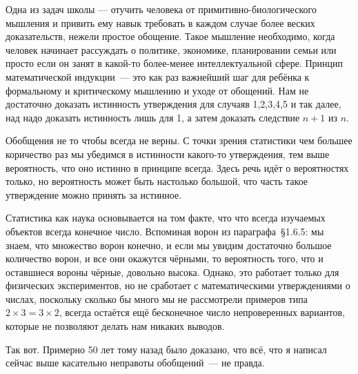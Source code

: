 Одна из задач школы --- отучить человека от примитивно-биологического мышления и привить ему навык требовать в каждом случае более веских доказательств, нежели простое обощение. Такое мышление необходимо, когда человек начинает рассуждать о политике, экономике, планировании семьи или просто если он занят в какой-то более-менее интеллектуальной сфере. Принцип математической индукции~--- это как раз важнейший шаг для ребёнка к формальному и критическому мышлению и уходе от обощений. Нам не достаточно доказать истинность утверждения для случаяв 1,2,3,4,5 и так далее, над надо доказать истинность лишь для 1, а затем доказать следствие $n+1$ из $n$.

Обобщения не то чтобы всегда не верны. С точки зрения статистики чем большее коричество раз мы убедимся в истинности какого-то утверждения, тем выше вероятность, что оно истинно в принципе всегда. Здесь речь идёт о вероятностях только, но вероятность может быть настолько большой, что часть такое утверждение можно принять за истинное.

Статистика как наука основывается на том факте, что что всегда изучаемых объектов всегда конечное число. Вспоминая ворон из параграфа~\S1.6.5: мы знаем, что множество ворон конечно, и если мы увидим достаточно большое количество ворон, и все они окажутся чёрными, то вероятность того, что и оставшиеся вороны чёрные, довольно высока. Однако, это работает только для физических экспериментов, но не сработает с математическими утверждениями о числах, поскольку сколько бы много мы не рассмотрели примеров типа $2\times 3=3\times 2$, всегда остаётся ещё бесконечное число непроверенных вариантов, которые не позволяют делать нам никаких выводов.

Так вот. Примерно 50 лет тому назад было доказано, что всё, что я написал сейчас выше касательно неправоты обобщений~--- не правда.

